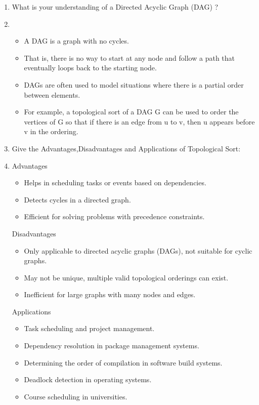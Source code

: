 ﻿\documentclass{article}
\newcommand{\answer}{\item [$\rightarrow$]}
\begin{document}
\begin{enumerate}
		\item What is your understanding of a Directed Acyclic Graph (DAG) ?
		\answer \begin{itemize}
			\item A DAG is a graph with no cycles.
			\item That is, there is no way to start at any node and follow a path that eventually loops back to the starting node.
			\item DAGs are often used to model situations where there is a partial order between elements.
			\item For example, a topological sort of a DAG G can be used to order the vertices of G so that if there is an edge from u to v, then u appears before v in the ordering.
		\end{itemize}
		
		\item Give the Advantages,Disadvantages and Applications of Topological Sort:
		\answer Advantages
		\begin{itemize}
			\item Helps in scheduling tasks or events based on dependencies.
			\item Detects cycles in a directed graph.
			\item Efficient for solving problems with precedence constraints.
		\end{itemize}
		
		Disadvantages
		\begin{itemize}
			\item Only applicable to directed acyclic graphs (DAGs), not suitable for cyclic graphs.
			\item May not be unique, multiple valid topological orderings can exist.
			\item Inefficient for large graphs with many nodes and edges.
		\end{itemize}
		
		Applications
		\begin{itemize}
			\item Task scheduling and project management.
			\item Dependency resolution in package management systems.
			\item Determining the order of compilation in software build systems.
			\item Deadlock detection in operating systems.
			\item Course scheduling in universities.
		\end{itemize}
		

\end{enumerate}
\end{document}
